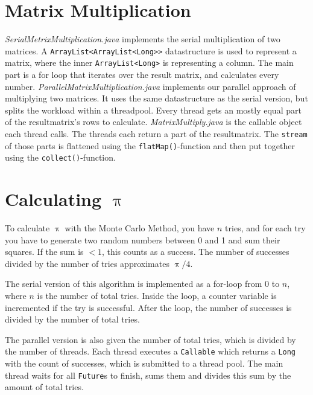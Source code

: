 \documentclass{article}
\begin{document}
  \section{Matrix Multiplication}

  \textit{SerialMetrixMultiplication.java} implements the serial multiplication of two matrices. A \texttt{ArrayList<ArrayList<Long>>} datastructure is used to represent a matrix, where the inner \texttt{ArrayList<Long>} is representing a column. The main part is a for loop that iterates over the result matrix, and calculates every number.\bigbreak
  \textit{ParallelMatrixMultiplication.java} implements our parallel approach of multiplying two matrices. It uses the same datastructure as the serial version, but splits the workload within a threadpool. Every thread gets an mostly equal part of the resultmatrix's rows to calculate. \textit{MatrixMultiply.java} is the callable object each thread calls. The threads each return a part of the resultmatrix. The \texttt{stream} of those parts is flattened using the \texttt{flatMap()}-function and then put together using the \texttt{collect()}-function.

  \section{Calculating $\uppi$}

  To calculate $\uppi$ with the Monte Carlo Method, you have $n$ tries, and for each try you have to generate two random numbers between 0 and 1 and sum their squares. If the sum is $< 1$, this counts as a success. The number of successes divided by the number of tries approximates $\uppi / 4$.

  The serial version of this algorithm is implemented as a for-loop from $0$ to $n$, where $n$ is the number of total tries. Inside the loop, a counter variable is incremented if the try is successful. After the loop, the number of successes is divided by the number of total tries.

  The parallel version is also given the number of total tries, which is divided by the number of threads. Each thread executes a \texttt{Callable} which returns a \texttt{Long} with the count of successes, which is submitted to a thread pool. The main thread waits for all \texttt{Future}s to finish, sums them and divides this sum by the amount of total tries.
\end{document}
